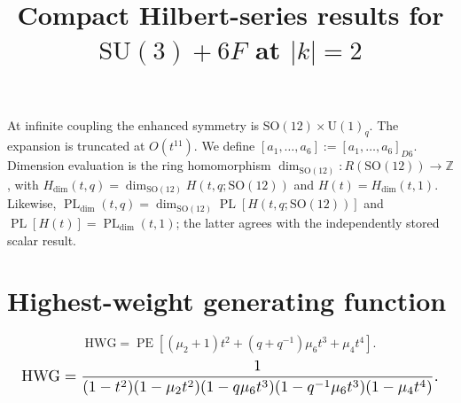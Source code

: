 \documentclass[10pt]{article}
\title{Compact Hilbert-series results for $\mathrm{SU(3)}+6F$ at $\lvert k\rvert=2$}
\date{}
\newcommand{\PE}{\operatorname{PE}}
\begin{document}
\maketitle
At infinite coupling the enhanced symmetry is $\mathrm{SO}(12)\times\mathrm{U}(1)_q$.
The expansion is truncated at $O(t^{11})$.  We define
$[a_1,\ldots,a_{6}]
:=[a_1,\ldots,a_{6}]_{D6}$.
Dimension evaluation is the ring homomorphism
$\dim_{\mathrm{SO}(12)}:R(\mathrm{SO}(12))\to\mathbb{Z}$, with
$H_{\mathrm{dim}}(t,q)=\dim_{\mathrm{SO}(12)}H(t,q;\mathrm{SO}(12))$
and $H(t)=H_{\mathrm{dim}}(t,1)$.  Likewise,
$\operatorname{PL}_{\mathrm{dim}}(t,q)=\dim_{\mathrm{SO}(12)}
\operatorname{PL}[H(t,q;\mathrm{SO}(12))]$ and
$\operatorname{PL}[H(t)]=\operatorname{PL}_{\mathrm{dim}}(t,1)$;
the latter agrees with the independently stored scalar result.

\section{Highest-weight generating function}
\begin{equation}
\mathrm{HWG}=\PE\!\left[(\mu_2+1)t^2+(q+q^{-1})\mu_6t^3+\mu_4t^4\right].
\end{equation}
\begin{equation}
\resizebox{0.98\linewidth}{!}{${\displaystyle
\mathrm{HWG}=\frac{1}{(1-t^2)(1-\mu_2t^2)(1-q\mu_6t^3)(1-q^{-1}\mu_6t^3)(1-\mu_4t^4)}.}$}
\end{equation}
\end{document}
